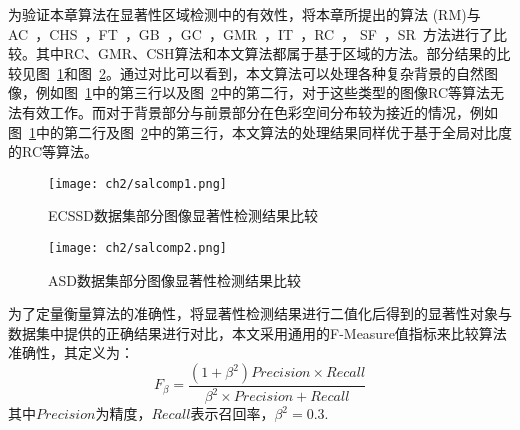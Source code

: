 为验证本章算法在显著性区域检测中的有效性，将本章所提出的算法 (RM)与AC~\cite{Achanta08}，CHS~\cite{Yan2014Hierarchical}，FT~\cite{saliencyFilter}，GB~\cite{Harel07graph-basedvisual}，GC~\cite{GC}，GMR~\cite{GMR}，IT~\cite{itti}，RC~\cite{ChengPAMI}， SF~\cite{saliencyFilter}，SR~\cite{SR}方法进行了比较。其中RC、GMR、CSH算法和本文算法都属于基于区域的方法。部分结果的比较见图~\ref{fig:chap2:comp1}和图~\ref{fig:chap2:comp2}。通过对比可以看到，本文算法可以处理各种复杂背景的自然图像，例如图~\ref{fig:chap2:comp1}中的第三行以及图~\ref{fig:chap2:comp2}中的第二行，对于这些类型的图像RC等算法无法有效工作。而对于背景部分与前景部分在色彩空间分布较为接近的情况，例如图~\ref{fig:chap2:comp1}中的第二行及图~\ref{fig:chap2:comp2}中的第三行，本文算法的处理结果同样优于基于全局对比度的RC等算法。\par
\begin{figure}[h]
  \centering%
      {\texttt{[image: ch2/salcomp1.png]}}

  \caption{ECSSD数据集部分图像显著性检测结果比较}
  \label{fig:chap2:comp1}
\end{figure}
\begin{figure}[h]
  \centering%
      {\texttt{[image: ch2/salcomp2.png]}}

  \caption{ASD数据集部分图像显著性检测结果比较}
  \label{fig:chap2:comp2}
\end{figure}
为了定量衡量算法的准确性，将显著性检测结果进行二值化后得到的显著性对象与数据集中提供的正确结果进行对比，本文采用通用的F-Measure值指标来比较算法准确性，其定义为：
$$F_{\beta} = \frac{(1+\beta^2)Precision \times Recall}{\beta^2 \times Precision + Recall}$$
其中$Precision$为精度，$Recall$表示召回率，$\beta^2=0.3$. \par

